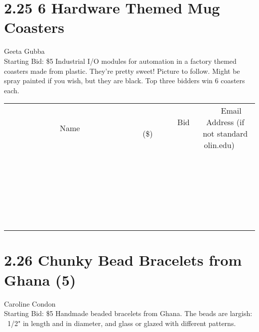 \documentclass[11pt]{article}
\begin{document}
\section*{2.25 6 Hardware Themed Mug Coasters}
Geeta Gubba
\\
Starting Bid: \$5
\newline
Industrial I/O modules for automation in a factory themed coasters made from plastic. They're pretty sweet! Picture to follow.
Might be spray painted if you wish, but they are black. Top three bidders win 6 coasters each.
\\[6ex]
\begin{tabular}{c c c}
~~~~~~~~~~~~~Name~~~~~~~~~~~~~ & ~~~~~~~~~Bid (\$)~~~~~~~~~  & ~~~Email Address (if not standard olin.edu)~~~\\
 & & \\
\hline
 & & \\
\hline
 & & \\
\hline
 & & \\
\hline
 & & \\
\hline
 & & \\
\hline
 & & \\
\hline
 & & \\
\hline
 & & \\
\hline
 & & \\
\hline
 & & \\
\hline
 & & \\
\hline
 & & \\
\hline
 & & \\
\hline
 & & \\
\hline
 & & \\
\hline
 & & \\
\hline
 & & \\
\hline
 & & \\
\hline
 & & \\
\hline
 & & \\
\hline
 & & \\
\hline
 & & \\
\hline
 & & \\
\hline
 & & \\
\hline
 & & \\
\hline
\end{tabular}
\newpage
\section*{2.26 Chunky Bead Bracelets from Ghana (5)}
Caroline Condon
\\
Starting Bid: \$5
\newline
Handmade beaded bracelets from Ghana. The beads are largish: ~1/2" in length and in diameter, and glass or glazed with different patterns.
\end{document}
